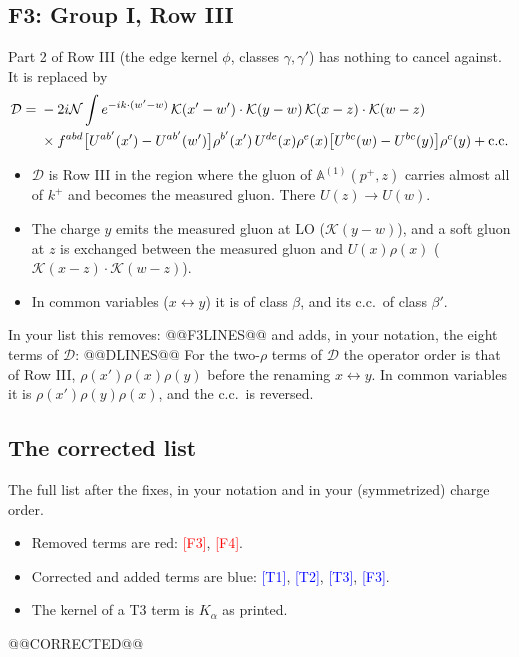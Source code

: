 \documentclass[10pt]{article}
\numberwithin{equation}{section}
\newcommand{\KK}{\mathcal K}
\newcommand{\NN}{\mathcal N}
\begin{document}
\subsection{F3: Group I, Row III}\label{sec:F3}
Part 2 of Row III (the edge kernel $\phi$, classes $\gamma,\gamma'$) has nothing to cancel against. It is replaced by
\begin{align}
\mathcal D={}&-2i\NN\int e^{-ik\cdot(w'-w)}\,\KK(x'-w')\cdot\KK(y-w)\,\KK(x-z)\cdot\KK(w-z)\notag\\
&\times f^{abd}\big[U^{ab'}(x')-U^{ab'}(w')\big]\rho^{b'}(x')\,U^{de}(x)\rho^e(x)\big[U^{bc}(w)-U^{bc}(y)\big]\rho^c(y)+{\rm c.c.}
\end{align}
\begin{itemize}
\item $\mathcal D$ is Row III in the region where the gluon of $\mathbb A^{(1)}(p^+,z)$ carries almost all of $k^+$ and becomes the measured gluon. There $U(z)\to U(w)$.
\item The charge $y$ emits the measured gluon at LO ($\KK(y-w)$), and a soft gluon at $z$ is exchanged between the measured gluon and $U(x)\rho(x)$ ($\KK(x-z)\cdot\KK(w-z)$).
\item In common variables ($x\leftrightarrow y$) it is of class $\beta$, and its c.c.\ of class $\beta'$.
\end{itemize}
In your list this removes:
@@F3LINES@@
and adds, in your notation, the eight terms of $\mathcal D$:
@@DLINES@@
For the two-$\rho$ terms of $\mathcal D$ the operator order is that of Row III, $\rho(x')\rho(x)\rho(y)$ before the renaming $x\leftrightarrow y$. In common variables it is $\rho(x')\rho(y)\rho(x)$, and the c.c.\ is reversed.

\subsection{The corrected list}\label{sec:corrected}
The full list after the fixes, in your notation and in your (symmetrized) charge order.
\begin{itemize}
\item Removed terms are red: \textcolor{red}{[F3]}, \textcolor{red}{[F4]}.
\item Corrected and added terms are blue: \textcolor{blue}{[T1]}, \textcolor{blue}{[T2]}, \textcolor{blue}{[T3]}, \textcolor{blue}{[F3]}.
\item The kernel of a T3 term is $K_\alpha$ as printed.
\end{itemize}
@@CORRECTED@@
\end{document}
